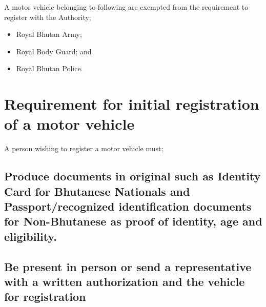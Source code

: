 \documentclass[
]{book}
\providecommand{\tightlist}{%
  \setlength{\itemsep}{0pt}\setlength{\parskip}{0pt}}
\begin{document}
A motor vehicle belonging to following are exempted from the requirement to register with the Authority;

\begin{itemize}
\tightlist
\item
  Royal Bhutan Army;
\item
  Royal Body Guard; and
\item
  Royal Bhutan Police.
\end{itemize}

\hypertarget{requirement-for-initial-registration-of-a-motor-vehicle}{%
\section{Requirement for initial registration of a motor vehicle}\label{requirement-for-initial-registration-of-a-motor-vehicle}}

A person wishing to register a motor vehicle must;

\hypertarget{produce-documents-in-original-such-as-identity-card-for-bhutanese-nationals-and-passportrecognized-identification-documents-for-non-bhutanese-as-proof-of-identity-age-and-eligibility.}{%
\subsection{Produce documents in original such as Identity Card for Bhutanese Nationals and Passport/recognized identification documents for Non-Bhutanese as proof of identity, age and eligibility.}\label{produce-documents-in-original-such-as-identity-card-for-bhutanese-nationals-and-passportrecognized-identification-documents-for-non-bhutanese-as-proof-of-identity-age-and-eligibility.}}

\hypertarget{be-present-in-person-or-send-a-representative-with-a-written-authorization-and-the-vehicle-for-registration}{%
\subsection{Be present in person or send a representative with a written authorization and the vehicle for registration}\label{be-present-in-person-or-send-a-representative-with-a-written-authorization-and-the-vehicle-for-registration}}
\end{document}
